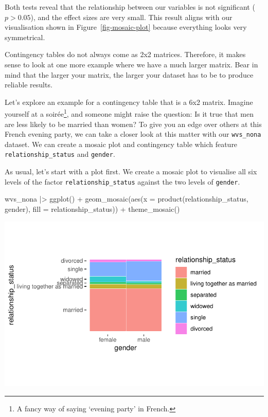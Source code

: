 \documentclass[
  letterpaper,
]{krantz}
\makeatletter
\newenvironment{Shaded}{\begin{snugshade}}{\end{snugshade}}
\newcommand{\AttributeTok}[1]{\textcolor[rgb]{0.40,0.45,0.13}{#1}}
\newcommand{\FunctionTok}[1]{\textcolor[rgb]{0.28,0.35,0.67}{#1}}
\newcommand{\NormalTok}[1]{\textcolor[rgb]{0.00,0.23,0.31}{#1}}
\newcommand{\SpecialCharTok}[1]{\textcolor[rgb]{0.37,0.37,0.37}{#1}}
\newenvironment{kframe}{%
\medskip{}
\setlength{\fboxsep}{.8em}
 \def\at@end@of@kframe{}%
 \ifinner\ifhmode%
  \def\at@end@of@kframe{\end{minipage}}%
  \begin{minipage}{\columnwidth}%
 \fi\fi%
 \def\FrameCommand##1{\hskip\@totalleftmargin \hskip-\fboxsep
 \colorbox{shadecolor}{##1}\hskip-\fboxsep
     \hskip-\linewidth \hskip-\@totalleftmargin \hskip\columnwidth}%
 \MakeFramed {\advance\hsize-\width
   \@totalleftmargin\z@ \linewidth\hsize
   \@setminipage}}%
 {\par\unskip\endMakeFramed%
 \at@end@of@kframe}
\renewenvironment{Shaded}{\begin{kframe}}{\end{kframe}}
\makeatother
\begin{document}
Both tests reveal that the relationship between our variables is not
significant (\(p > 0.05\)), and the effect sizes are very small. This
result aligns with our visualisation shown in
Figure~\ref{fig-mosaic-plot} because everything looks very symmetrical.

Contingency tables do not always come as 2x2 matrices. Therefore, it
makes sense to look at one more example where we have a much larger
matrix. Bear in mind that the larger your matrix, the larger your
dataset has to be to produce reliable results.

Let's explore an example for a contingency table that is a 6x2 matrix.
Imagine yourself at a soirée\footnote{A fancy way of saying `evening
  party' in French.}, and someone might raise the question: Is it true
that men are less likely to be married than women? To give you an edge
over others at this French evening party, we can take a closer look at
this matter with our \texttt{wvs\_nona} dataset. We can create a mosaic
plot and contingency table which feature \texttt{relationship\_status}
and \texttt{gender}.

As usual, let's start with a plot first. We create a mosaic plot to
visualise all six levels of the factor \texttt{relationship\_status}
against the two levels of \texttt{gender}.

\begin{Shaded}
\begin{Highlighting}[]
\NormalTok{wvs\_nona }\SpecialCharTok{|\textgreater{}}
  \FunctionTok{ggplot}\NormalTok{() }\SpecialCharTok{+}
  \FunctionTok{geom\_mosaic}\NormalTok{(}\FunctionTok{aes}\NormalTok{(}\AttributeTok{x =} \FunctionTok{product}\NormalTok{(relationship\_status, gender),}
                  \AttributeTok{fill =}\NormalTok{ relationship\_status)) }\SpecialCharTok{+}
  \FunctionTok{theme\_mosaic}\NormalTok{()}
\end{Highlighting}
\end{Shaded}

\includegraphics{11_group_comparison_files/figure-pdf/contigency-tbl-plot-relationship-status-gender-1.pdf}
\end{document}
